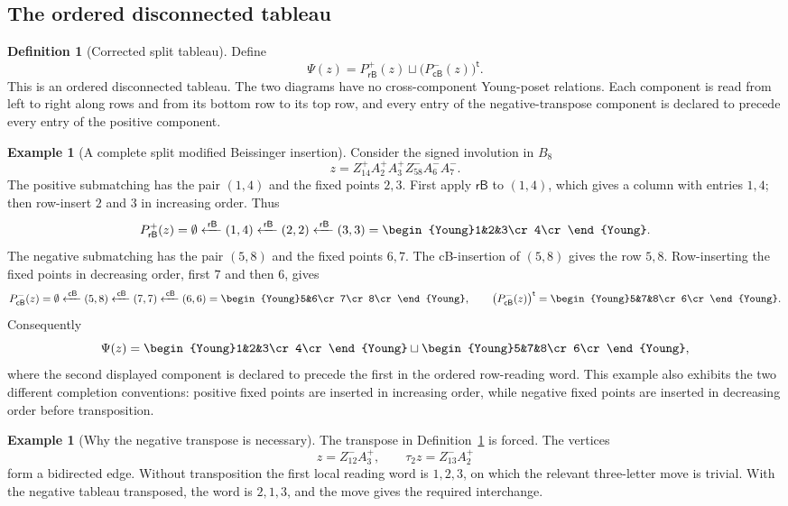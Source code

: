 \documentclass[11pt]{article}
\theoremstyle{definition}
\newtheorem{definition}[theorem]{Definition}
\newtheorem{example}[theorem]{Example}
\theoremstyle{remark}
\newcommand{\PRBSp}{P_{\mathsf{rB}}^{+}}
\newcommand{\PCBSm}{P_{\mathsf{cB}}^{-}}
\newcommand{\fromRBS}{\xleftarrow{\,\mathsf{rB}\,}}
\newcommand{\fromCBS}{\xleftarrow{\,\mathsf{cB}\,}}
\newcommand{\rowtableau}[1]{\vcenter{\hbox{\begin{Young}#1\end{Young}}}}
\begin{document}
\subsection{The ordered disconnected tableau}

\begin{definition}[Corrected split tableau]
\label{def:Psi}
Define
\[
       \Psi(z)=\PRBSp(z)\sqcup\bigl(\PCBSm(z)\bigr)^{\mathsf t}.
\]
This is an ordered disconnected tableau.  The two diagrams have no
cross-component Young-poset relations.  Each component is read from left
to right along rows and from its bottom row to its top row, and every entry
of the negative-transpose component is declared to precede every entry of
the positive component.
\end{definition}

\begin{example}[A complete split modified Beissinger insertion]
\label{ex:split-insertion}
Consider the signed involution in $B_8$
\[
 z=Z_{14}^+A_2^+A_3^+Z_{58}^-A_6^-A_7^-.
\]
The positive submatching has the pair $(1,4)$ and the fixed points $2,3$.
First apply $\mathsf{rB}$ to $(1,4)$, which gives a column with entries
$1,4$; then
row-insert $2$ and $3$ in increasing order.  Thus
\[
 \PRBSp(z)
 =\emptyset\fromRBS(1,4)\fromRBS(2,2)\fromRBS(3,3)
 =\rowtableau{1&2&3\cr4\cr}.
\]
The negative submatching has the pair $(5,8)$ and the fixed points $6,7$.
The cB-insertion of $(5,8)$ gives the row $5,8$.  Row-inserting the fixed
points in decreasing order, first $7$ and then $6$, gives
\[
 \PCBSm(z)
 =\emptyset\fromCBS(5,8)\fromCBS(7,7)\fromCBS(6,6)
 =\rowtableau{5&6\cr7\cr8\cr},
 \qquad
 \bigl(\PCBSm(z)\bigr)^{\mathsf t}=\rowtableau{5&7&8\cr6\cr}.
\]
Consequently
\[
 \Psi(z)=
 \rowtableau{1&2&3\cr4\cr}
 \sqcup
 \rowtableau{5&7&8\cr6\cr},
\]
where the second displayed component is declared to precede the first in
the ordered row-reading word.  This example also exhibits the two
different completion conventions: positive fixed points are inserted in
increasing order, while negative fixed points are inserted in decreasing
order before transposition.
\end{example}

\begin{example}[Why the negative transpose is necessary]
\label{ex:negative-transpose}
The transpose in Definition~\ref{def:Psi} is forced.  The vertices
\[
 z=Z_{12}^-A_3^+,
 \qquad
 \tau_2z=Z_{13}^-A_2^+
\]
form a bidirected edge.  Without transposition the first local reading
word is $1,2,3$, on which the relevant three-letter move is trivial.  With
the negative tableau transposed, the word is $2,1,3$, and the move gives
the required interchange.
\end{example}
\end{document}
